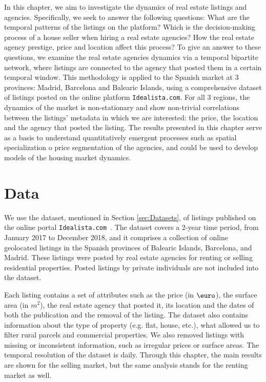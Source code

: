 In this chapter, we aim to investigate the dynamics of real estate listings and agencies. Specifically, we seek to answer the following questions: What are the temporal patterns of the listings on the platform? Which is the decision-making process of a house seller when hiring a real estate agencies? How the real estate agency prestige, price and location affect this process? To give an answer to these questions, we examine the real estate agencies dynamics via a temporal bipartite network, where listings are connected to the agency that posted them in a certain temporal window. This methodology is applied to the Spanish market at 3 provinces: Madrid, Barcelona and Balearic Islands, using a comprehensive dataset of listings posted on the online platform \texttt{Idealista.com}. For all 3 regions, the dynamics of the market is non-stationary and show non-trivial correlations between the listings' metadata in which we are interested: the price, the location and the agency that posted the listing. The results presented in this chapter serve as a basis to understand quantitatively emergent processes such as spatial specialization o price segmentation of the agencies, and could be used to develop models of the housing market dynamics.

\section{Data \label{sec:Data}}

We use the dataset, mentioned in Section \ref{sec:Datasets}, of listings published on the online portal \texttt{Idealista.com}~\cite{idealista}. The dataset covers a 2-year time period, from January 2017 to December 2018, and it comprises a collection of online geolocated listings in the Spanish provinces of Balearic Islands, Barcelona, and Madrid. These listings were posted by real estate agencies for renting or selling residential properties. Posted listings by private individuals are not included into the dataset.

Each listing contains a set of attributes such as the price (in $\textup{\euro}$), the surface area (in $m^2$), the real estate agency that posted it, its location and the dates of both the publication and the removal of the listing. The dataset also contains information about the type of property (e.g. flat, house, etc.), what allowed us to filter rural parcels and commercial properties. We also removed listings with missing or inconsistent information, such as irregular prices or surface areas. The temporal resolution of the dataset is daily. Through this chapter, the main results are shown for the selling market, but the same analysis stands for the renting market as well.


